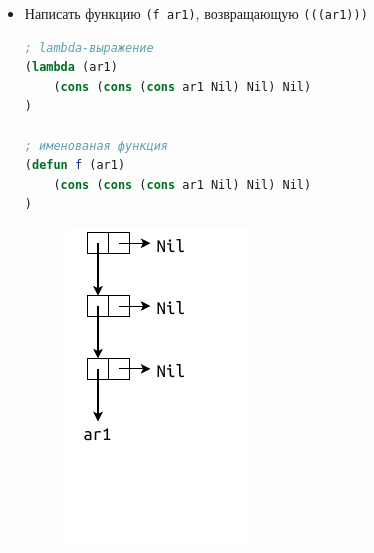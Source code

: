 \begin{itemize}[$\bullet$]
	\item Написать функцию \texttt{(f ar1)}, возвращающую \texttt{(((ar1)))}
	
\begin{lstlisting}[language=Lisp]
; lambda-выражение
(lambda (ar1)
	(cons (cons (cons ar1 Nil) Nil) Nil)
)

; именованая функция
(defun f (ar1)
	(cons (cons (cons ar1 Nil) Nil) Nil)
)
\end{lstlisting}

	\begin{figure}[ht]
		\centering
		\includegraphics[scale=1.2]{img/1-9}
	\end{figure}

\end{itemize}
